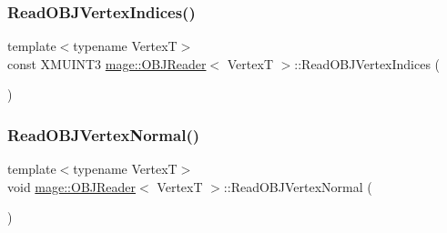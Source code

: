 \hypertarget{classmage_1_1_o_b_j_reader_a2e807f8c18874135888d1e99d4d08d90}{}\label{classmage_1_1_o_b_j_reader_a2e807f8c18874135888d1e99d4d08d90} 
\subsubsection{\texorpdfstring{Read\+O\+B\+J\+Vertex\+Indices()}{ReadOBJVertexIndices()}}
{\footnotesize\ttfamily template$<$typename VertexT$>$ \\
const X\+M\+U\+I\+N\+T3 \hyperlink{classmage_1_1_o_b_j_reader}{mage\+::\+O\+B\+J\+Reader}$<$ VertexT $>$\+::Read\+O\+B\+J\+Vertex\+Indices (\begin{DoxyParamCaption}{ }\end{DoxyParamCaption})\hspace{0.3cm}{\ttfamily [private]}}

\hypertarget{classmage_1_1_o_b_j_reader_aa9ef2ced0ad787b13818722c7dfa0636}{}\label{classmage_1_1_o_b_j_reader_aa9ef2ced0ad787b13818722c7dfa0636} 
\subsubsection{\texorpdfstring{Read\+O\+B\+J\+Vertex\+Normal()}{ReadOBJVertexNormal()}}
{\footnotesize\ttfamily template$<$typename VertexT$>$ \\
void \hyperlink{classmage_1_1_o_b_j_reader}{mage\+::\+O\+B\+J\+Reader}$<$ VertexT $>$\+::Read\+O\+B\+J\+Vertex\+Normal (\begin{DoxyParamCaption}{ }\end{DoxyParamCaption})\hspace{0.3cm}{\ttfamily [private]}}

\hypertarget{classmage_1_1_o_b_j_reader_a2be022b43cf2ad848c7a2d013b16e5f2}{}\label{classmage_1_1_o_b_j_reader_a2be022b43cf2ad848c7a2d013b16e5f2} 
